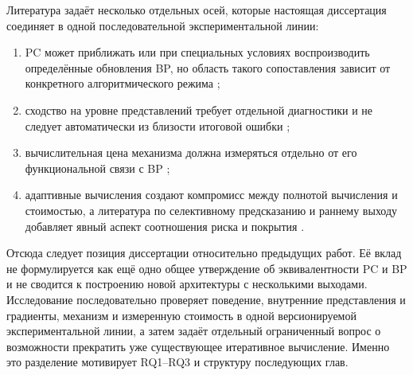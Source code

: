 Литература задаёт несколько отдельных осей, которые настоящая диссертация
соединяет в одной последовательной экспериментальной линии:

\begin{enumerate}
  \item PC может приближать или при специальных условиях воспроизводить
        определённые обновления BP, но область такого сопоставления зависит от
        конкретного алгоритмического режима
        \cite{whittington2017approximation,song2020exact,
        salvatori2021convolutional,millidge2022arbitrary,
        rosenbaum2022relationship,rosenbaum2025correction};

  \item сходство на уровне представлений требует отдельной диагностики и не
        следует автоматически из близости итоговой ошибки
        \cite{raghu2017svcca,morcos2018insights,kornblith2019similarity};

  \item вычислительная цена механизма должна измеряться отдельно от его
        функциональной связи с BP
        \cite{zahid2023critical};

  \item адаптивные вычисления создают компромисс между полнотой вычисления и
        стоимостью, а литература по селективному предсказанию и раннему выходу
        добавляет явный аспект соотношения риска и покрытия
        \cite{graves2016adaptive,bolukbasi2017adaptive,
        zniber2025earlyexit,geifman2019selectivenet,
        jazbec2024riskcontrol,valade2025eero}.
\end{enumerate}

Отсюда следует позиция диссертации относительно предыдущих работ. Её вклад не
формулируется как ещё одно общее утверждение об эквивалентности PC и BP и не
сводится к построению новой архитектуры с несколькими выходами. Исследование
последовательно проверяет поведение, внутренние представления и градиенты,
механизм и измеренную стоимость в одной версионируемой экспериментальной линии,
а затем задаёт отдельный ограниченный вопрос о возможности прекратить
уже существующее итеративное вычисление. Именно это разделение мотивирует
RQ1--RQ3 и структуру последующих глав.
